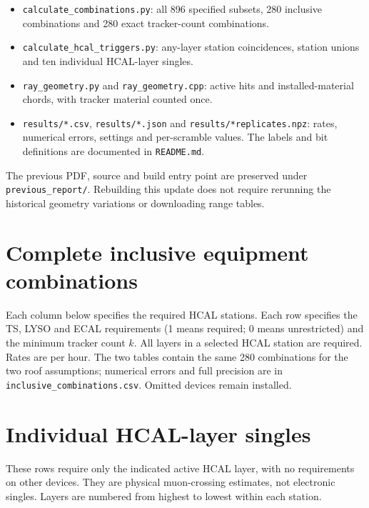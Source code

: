 \begin{itemize}
\item \texttt{calculate\_combinations.py}: all 896 specified subsets,
      280 inclusive combinations and 280 exact tracker-count combinations.
\item \texttt{calculate\_hcal\_triggers.py}: any-layer station coincidences,
      station unions and ten individual HCAL-layer singles.
\item \texttt{ray\_geometry.py} and \texttt{ray\_geometry.cpp}: active hits and
      installed-material chords, with tracker material counted once.
\item \texttt{results/*.csv}, \texttt{results/*.json} and
      \texttt{results/*replicates.npz}: rates, numerical errors, settings and
      per-scramble values. The labels and bit definitions are documented in
      \texttt{README.md}.
\end{itemize}
The previous PDF, source and build entry point are preserved under
\texttt{previous\_report/}. Rebuilding this update does not require rerunning
the historical geometry variations or downloading range tables.

\appendix
\clearpage
\section{Complete inclusive equipment combinations}
\label{app:all}
Each column below specifies the required HCAL stations. Each row specifies
the TS, LYSO and ECAL requirements (1 means required; 0 means unrestricted)
and the minimum tracker count $k$. All layers in a selected HCAL station are
required. Rates are per hour. The two tables contain the same 280 combinations
for the two roof assumptions; numerical errors and full precision are in
\texttt{inclusive\_combinations.csv}. Omitted devices remain installed.

\clearpage


\clearpage
\section{Individual HCAL-layer singles}
\label{app:singles}
These rows require only the indicated active HCAL layer, with no requirements
on other devices. They are physical muon-crossing estimates, not electronic
singles. Layers are numbered from highest to lowest within each station.


